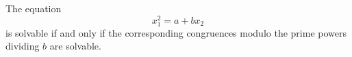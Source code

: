 \begin{proposition}
    The equation
\[
    x_1^2=a+bx_2
\]
    is solvable if and only if the corresponding congruences modulo the prime powers dividing $b$ are solvable.
\end{proposition}
